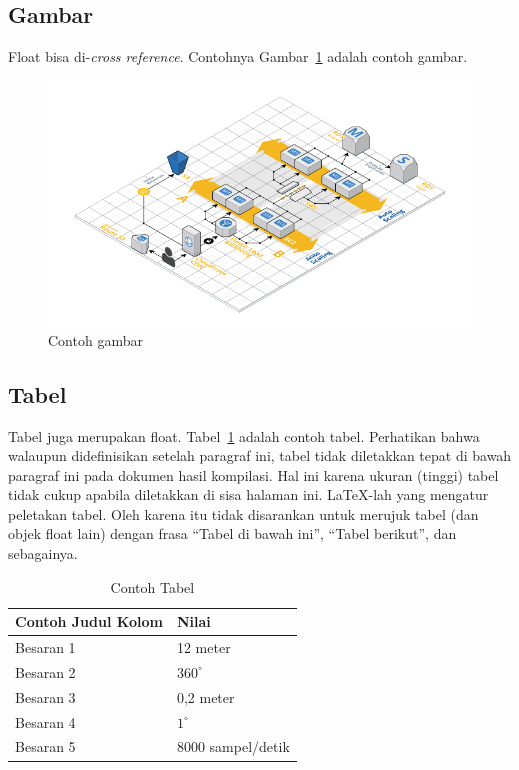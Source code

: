 \documentclass[../index.tex]{subfiles}
\begin{document}
\subsection{Gambar}

Float bisa di-\textit{cross reference}. Contohnya Gambar~\ref{fig:contoh_gambar} adalah contoh gambar.

\begin{figure}[h]
	\centering
	\includegraphics[width=\textwidth]{../assets/chapter-2-infrastructure-diagram.png}
	\caption{Contoh gambar}
	\label{fig:contoh_gambar}
\end{figure}

\subsection{Tabel}

Tabel juga merupakan float. Tabel~\ref{table:contoh_tabel} adalah contoh tabel. Perhatikan bahwa walaupun didefinisikan setelah paragraf ini, tabel tidak diletakkan tepat di bawah paragraf ini pada dokumen hasil kompilasi. Hal ini karena ukuran (tinggi) tabel tidak cukup apabila diletakkan di sisa halaman ini. \LaTeX-lah yang mengatur peletakan tabel. Oleh karena itu tidak disarankan untuk merujuk tabel (dan objek float lain) dengan frasa ``Tabel di bawah ini'', ``Tabel berikut'', dan sebagainya.

\begin{table}[htbp]
	\centering
	\caption{Contoh Tabel}
	\label{table:contoh_tabel}
	\begin{tabular}{ll}
		\toprule
		\multicolumn{1}{l}{\textbf{Contoh Judul Kolom}} & \multicolumn{1}{l}{\textbf{Nilai}} \\
		\midrule
		Besaran 1                                       & 12 meter                           \\
		Besaran 2                                       & $360^\circ$                        \\
		Besaran 3                                       & 0,2 meter                          \\
		Besaran 4                                       & $1^\circ$                          \\
		Besaran 5                                       & 8000 sampel/detik                  \\
		\bottomrule
	\end{tabular}
\end{table}
\end{document}
